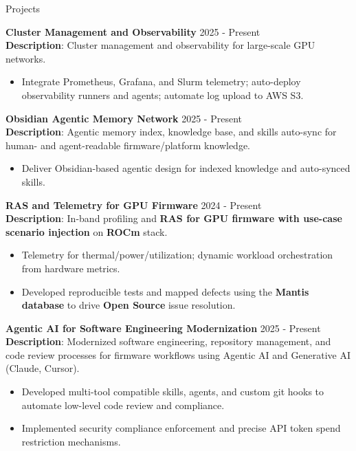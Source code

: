 \documentclass{resume} %
\begin{document}
\begin{rSection}{Projects}

{\bf Cluster Management and Observability} \hfill {2025 - Present}\\
\textbf{Description}: Cluster management and observability for large-scale GPU networks.
\begin{itemize}
    \item Integrate Prometheus, Grafana, and Slurm telemetry; auto-deploy observability runners and agents; automate log upload to AWS S3.
\end{itemize}

{\bf Obsidian Agentic Memory Network} \hfill {2025 - Present}\\
\textbf{Description}: Agentic memory index, knowledge base, and skills auto-sync for human- and agent-readable firmware/platform knowledge.
\begin{itemize}
    \item Deliver Obsidian-based agentic design for indexed knowledge and auto-synced skills.
\end{itemize}

{\bf \textbf{RAS} and Telemetry for \textbf{GPU Firmware}} \hfill {2024 - Present}\\
\textbf{Description}: In-band profiling and \textbf{RAS for GPU firmware with use-case scenario injection} on \textbf{ROCm} stack.

\begin{itemize}
    \item Telemetry for thermal/power/utilization; dynamic workload orchestration from hardware metrics.
    \item Developed reproducible tests and mapped defects using the \textbf{Mantis database} to drive \textbf{Open Source} issue resolution.
\end{itemize}

{\bf Agentic AI for Software Engineering Modernization} \hfill {2025 - Present}\\
\textbf{Description}: Modernized software engineering, repository management, and code review processes for firmware workflows using Agentic AI and Generative AI (Claude, Cursor).
\begin{itemize}
    \item Developed multi-tool compatible skills, agents, and custom git hooks to automate low-level code review and compliance.
    \item Implemented security compliance enforcement and precise API token spend restriction mechanisms.
\end{itemize}


\end{rSection}
\end{document}
